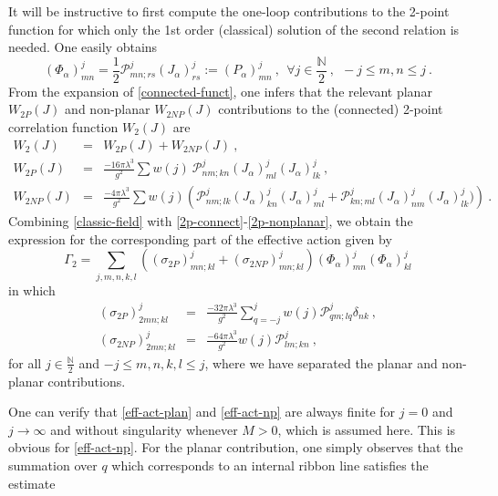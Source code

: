 \documentclass[a4paper,11pt,twoside]{article}
\numberwithin{equation}{section}
\theoremstyle{nonumberplain}
\newcounter{and}
\begin{document}
%
It will be instructive to first compute the one-loop contributions to the 2-point function for which only the 1st order (classical) solution of the second relation is needed. One easily obtains%
%
\begin{equation}
(\Phi_\alpha)^j_{mn} = \frac{1}{2} \mathcal{P}^j_{mn;rs}(J_\alpha)^j_{rs}
:= (P_\alpha)^j_{mn} \ , \ \ \forall j\in\frac{\mathbb{N}}{2} \ , \ \ -j\le m,n\le j \ . \label{classic-field}
\end{equation}
%
From the expansion of \eqref{connected-funct}, one infers that the relevant planar $W_{2P}(J)$ and non-planar $W_{2NP}(J)$ contributions to the (connected) 2-point correlation function $W_2(J)$ are%
%
\begin{eqnarray}
%
W_2(J) &=& W_{2P}(J) + W_{2NP}(J) \label{2p-connect} \ , \\
%
W_{2P}(J) &=& \frac{-16\pi\lambda^3}{g^2} \sum w(j) \ \mathcal{P}^j_{nm;kn} (J_\alpha)^j_{ml}(J_\alpha)^j_{lk} \ , \label{2p-planar} \\
%
W_{2NP}(J) &=& \frac{-4\pi\lambda^3}{g^2} \sum w(j) \left( \mathcal{P}^j_{nm;lk} (J_\alpha)^j_{kn}(J_\alpha)^j_{ml} + \mathcal{P}^j_{kn;ml}(J_\alpha)^j_{nm} (J_\alpha)^j_{lk}) \right) \ . \label{2p-nonplanar}
%
\end{eqnarray}
%
Combining \eqref{classic-field} with \eqref{2p-connect}-\eqref{2p-nonplanar}, we obtain the expression for the corresponding part of the effective action given by%
%
\begin{equation}
\Gamma_{2} = \sum_{j,m,n,k,l} \left((\sigma_{2P})^j_{mn;kl} + (\sigma_{2NP})^j_{mn;kl}\right)(\Phi_\alpha)^j_{mn} (\Phi_\alpha)^j_{kl}\label{effect-action-1loop}
\end{equation}
in which
\begin{eqnarray}
%
(\sigma_{2P})^j_{2mn;kl} &=& \frac{-32\pi\lambda^3}{g^2} \sum_{q=-j}^j w(j) \mathcal{P}^j_{qm;lq} \delta_{nk} \ , \label{eff-act-plan} \\
%
(\sigma_{2NP})^j_{2mn;kl} &=& \frac{-64\pi\lambda^3}{g^2} w(j) \mathcal{P}^j_{lm;kn} \ , \label{eff-act-np}
%
\end{eqnarray}
%
for all $j\in\frac{\mathbb{N}}{2}$ and $-j\le m,n,k,l\le j$, where we have separated the planar and non-planar contributions.\par%
%
One can verify that \eqref{eff-act-plan} and \eqref{eff-act-np} are always finite for $j=0$ and $j\to\infty$ and without singularity whenever $M>0$, which is assumed here. This is obvious for \eqref{eff-act-np}. For the planar contribution, one simply observes that the summation over $q$ which corresponds to an internal ribbon line satisfies the estimate%
\end{document}
